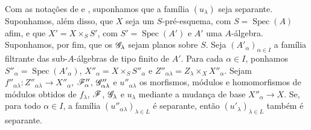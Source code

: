 \begin{lemma}[11.9.12]
\label{IV.11.9.12}
Com as notações de
 e
,
suponhamos que a família
$(u_\lambda)$ seja
separante. Suponhamos,
além disso, que $X$
seja um $S$-pré-esquema,
com
$S=\operatorname{Spec}(A)$
afim, e que
$X'=X\times_S S'$,
com
$S'=\operatorname{Spec}(A')$
e $A'$ uma $A$-álgebra.
Suponhamos, por fim, que
os $\mathscr{G}_\lambda$
sejam planos sobre $S$.
Seja
$(A'_\alpha)_{\alpha\in I}$
a família filtrante das
sub-$A$-álgebras de
tipo finito de $A'$.
Para cada $\alpha\in I$,
ponhamos
$S''_\alpha=
\operatorname{Spec}(A'_\alpha)$,
$X''_\alpha=
X\times_S S''_\alpha$
e
$Z''_{\alpha\lambda}=
Z_\lambda\times_X
X''_\alpha$.
Sejam
$f''_{\alpha\lambda}:
Z''_{\alpha\lambda}
\to X''_\alpha$,
$\mathscr{F}''_\alpha$,
$\mathscr{G}''_{\alpha\lambda}$
e $u''_{\alpha\lambda}$
os morfismos, módulos
e homomorfismos de
módulos obtidos de
$f_\lambda$, $\mathscr{F}$,
$\mathscr{G}_\lambda$ e
$u_\lambda$ mediante
a mudança de base
$X''_\alpha\to X$.
Se, para todo
$\alpha\in I$, a família
$(u''_{\alpha\lambda})
_{\lambda\in L}$ é
separante, então
$(u'_\lambda)_{\lambda\in L}$
também é separante.
\end{lemma}

